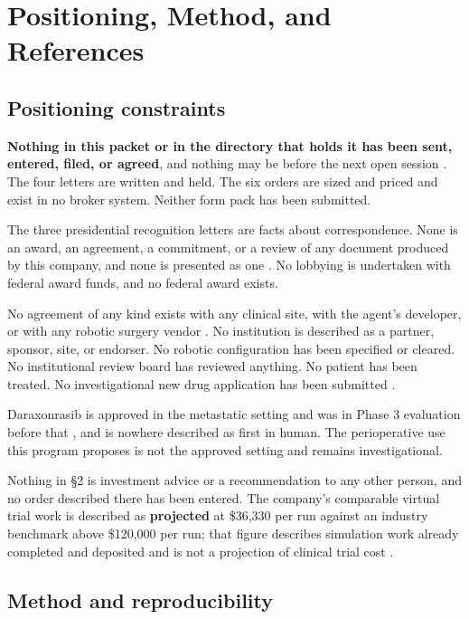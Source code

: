 \section{Positioning, Method, and References}

\subsection{Positioning constraints}

\textbf{Nothing in this packet or in the directory that holds it has been sent,
entered, filed, or agreed}, and nothing may be before the next open session
\cite{opmholidays2026,nyseholidays2026}. The four letters are written and held.
The six orders are sized and priced and exist in no broker system. Neither form
pack has been submitted.

The three presidential recognition letters are facts about correspondence. None
is an award, an agreement, a commitment, or a review of any document produced by
this company, and none is presented as one \cite{movein2026}. No lobbying is
undertaken with federal award funds, and no federal award exists.

No agreement of any kind exists with any clinical site, with the agent's
developer, or with any robotic surgery vendor
\cite{ucsdmoores2026,revmedexternal2026}. No institution is described as a
partner, sponsor, site, or endorser. No robotic configuration has been specified
or cleared. No institutional review board has reviewed anything. No patient has
been treated. No investigational new drug application has been submitted
\cite{ecfr2026part312}.

Daraxonrasib is approved in the metastatic setting and was in Phase 3 evaluation
before that \cite{fdarasonque2026,rasolute302}, and is nowhere described as first
in human. The perioperative use this program proposes is not the approved
setting and remains investigational.

Nothing in \S2 is investment advice or a recommendation to any other person, and
no order described there has been entered. The company's comparable virtual trial
work is described as \textbf{projected} at \$36,330 per run against an industry
benchmark above \$120,000 per run; that figure describes simulation work already
completed and deposited and is not a projection of clinical trial cost
\cite{capitalplan2026}.

\subsection{Method and reproducibility}

